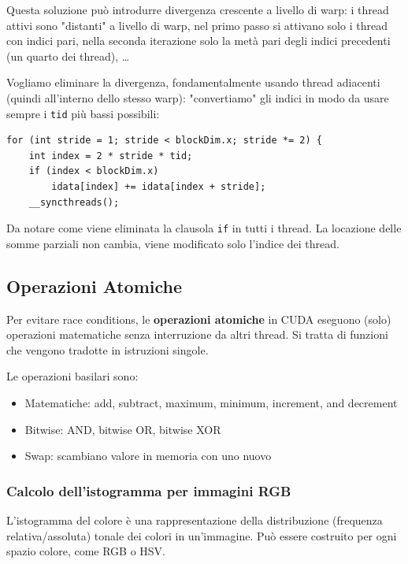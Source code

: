 Questa soluzione può introdurre divergenza crescente a livello di warp: i thread attivi sono "distanti" a livello di warp, nel primo passo si attivano solo i thread con indici pari, nella seconda iterazione solo la metà pari degli indici precedenti (un quarto dei thread), \dots

Vogliamo eliminare la divergenza, fondamentalmente usando thread adiacenti (quindi all'interno dello stesso warp): "convertiamo" gli indici in modo da usare sempre i \texttt{tid} più bassi possibili:
\begin{verbatim}
for (int stride = 1; stride < blockDim.x; stride *= 2) {
    int index = 2 * stride * tid;
    if (index < blockDim.x)
        idata[index] += idata[index + stride];
    __syncthreads();
\end{verbatim}

Da notare come viene eliminata la clausola \texttt{if} in tutti i thread. La locazione delle somme parziali non cambia, viene modificato solo l'indice dei thread.

\subsection{Operazioni Atomiche}

Per evitare race conditions, le \textbf{operazioni atomiche} in CUDA eseguono (solo) operazioni matematiche senza interruzione da altri thread. Si tratta di funzioni che vengono tradotte in istruzioni singole.

Le operazioni basilari sono:
\begin{itemize}
	\item Matematiche: add, subtract, maximum, minimum, increment, and decrement
	
	\item Bitwise: AND, bitwise OR, bitwise XOR
	
	\item Swap: scambiano valore in memoria con uno nuovo
\end{itemize}

\subsubsection{Calcolo dell'istogramma per immagini RGB}

L'istogramma del colore è una rappresentazione della distribuzione (frequenza relativa/assoluta) tonale dei colori in un'immagine. Può essere costruito per ogni spazio colore, come RGB o HSV.

